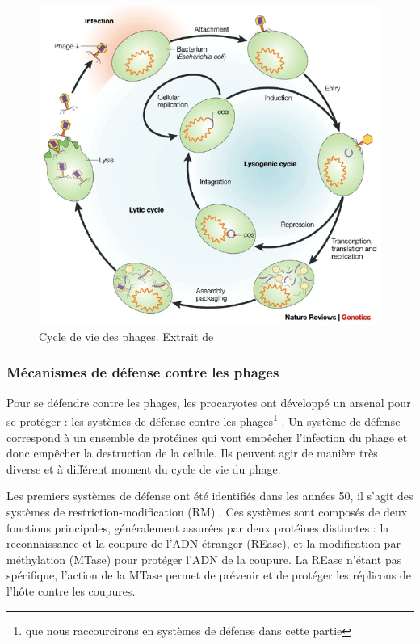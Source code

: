 \begin{figure}
    \centering
    \includegraphics[width=0.75\linewidth]{images/cycle_phages.png}
    \caption[Cycle de vie des phages]{Cycle de vie des phages. Extrait de \cite{campbell_future_2003}}
    \label{fig:cycle_phage}
\end{figure}

\newpage
\subsubsection{Mécanismes de défense contre les phages}

Pour se défendre contre les phages, les procaryotes ont  développé un arsenal pour se protéger : les systèmes de défense contre les phages\footnote{que nous raccourcirons en systèmes de défense dans cette partie} \cite{makarova_comparative_2013}. Un système de défense correspond à un ensemble de protéines qui vont empêcher l'infection du phage et donc empêcher la destruction de la cellule. Ils peuvent agir de manière très diverse et à différent moment du cycle de vie du phage. 


Les premiers systèmes de défense ont été identifiés dans les années 50, il s'agit des systèmes de restriction-modification (RM) \cite{bertani_host_1953}. Ces systèmes sont composés de deux fonctions principales, généralement assurées par deux protéines distinctes : la reconnaissance et la coupure de l'ADN étranger (REase), et la modification par méthylation (MTase) pour protéger l'ADN de la coupure. La REase n'étant pas spécifique, l'action de la MTase permet de prévenir et de protéger les réplicons de l'hôte contre les coupures.


